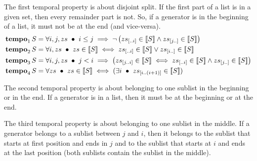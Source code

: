 \documentclass[12pt,openright,twoside,a4paper,oldfontcommands,english,brazil,final]{abntex2}
\newtheorem{definition}{Definition}[chapter]
\theoremstyle{theo}
\newcommand{\distinctlist}{%
  distinct list\footnote{Although some may use the terminology ``disjoint list'' to call a list of non-repeated elements, we use the same terminology (distinct list) of the theories built-in the \isabellehol tool.}%
  \global\renewcommand{\distinctlist}{distinct list}%
  \global\renewcommand{\distinctlists}{distinct lists}%
}
\newcommand{\distinctlists}{%
  distinct lists\footnote{Although some may use the terminology ``disjoint lists'' to call the lists of non-repeated elements, we use the same terminology (distinct lists) of the theories built-in the \isabellehol tool.}%
  \global\renewcommand{\distinctlist}{distinct list\xspace}%
  \global\renewcommand{\distinctlists}{distinct lists\xspace}%
  \xspace%
}
\newcommand{\isabellehol}[1][]{%
  Isabelle/HOL{#1}\index{Isabelle/HOL}~2015\footnote{The 2002 tutorial is reported in~\cite{NPW2002}, but there is a newer version published with the tool itself.
  The tool and the tutorial are available on their website at \url{http://isabelle.in.tum.de}.}%
  \global\renewcommand{\isabellehol}[1][]{Isabelle/HOL{#1}\index{Isabelle/HOL}\xspace}\xspace %
}
\newcommand{\sliceright}[2]{\ensuremath #1_{\left[..#2\right]}}
\newcommand{\sliceleft}[2]{\ensuremath #1_{\left[#2..\right]}}
\newcommand{\slice}[3]{\ensuremath #1_{\left[#2..#3\right]}}
\def\Tempotext{Tempo\xspace}
\def\tempoop{\ensuremath\operatorname{\mathbf{tempo}}}
\newcommand{\tempo}[2][1-4]{\ensuremath\tempoop_{#1} #2}
\newcommand{\denote}[1]{\ensuremath\left[\!\left[#1\right]\!\right]}
\begin{document}
The first temporal property is about disjoint split.
If the first part of a list is in a given set, then every remainder part is not.
So, if a generator is in the beginning of a list, it must not be at the end (and vice-versa).
%
%
\begin{subequations}
\begin{align}
\tempo[1]{S} &= \forall i, j, zs ~\bullet~
  i \le j \implies
  \lnot \left(
    \sliceright{zs}{i} \in \denote{S} \land \sliceleft{zs}{j} \in \denote{S}
  \right)\label{def:tempo1}\\
\tempo[2]{S} &= \forall i, zs ~\bullet~
  zs \in \denote{S} \iff
  \sliceright{zs}{i} \in \denote{S} \lor \sliceleft{zs}{i} \in \denote{S}\label{def:tempo2}\\
\tempo[3]{S} &= \forall i, j, zs ~\bullet~
  j < i \implies
  \left(
    \slice{zs}{j}{i} \in \denote{S} \iff \sliceright{zs}{i} \in \denote{S} \land \sliceleft{zs}{j} \in \denote{S}
  \right)\label{def:tempo3}\\
\tempo[4]{S} &= \forall zs ~\bullet~ zs \in \denote{S} \iff (\exists i ~\bullet~ \slice{zs}{i}{\left(i+1\right)} \in \denote{S})\label{def:tempo4}
\end{align}
\end{subequations}

The second temporal property is about belonging to one sublist in the beginning or in the end.
If a generator is in a list, then it must be at the beginning or at the end.
%
%

The third temporal property is about belonging to one sublist in the middle.
If a generator belongs to a sublist between $j$ and $i$, then it belongs to the sublist that starts at first position and ends in $j$ and to the sublist that starts at $i$ and ends at the last position (both sublists contain the sublist in the middle).
%
%
\end{document}
